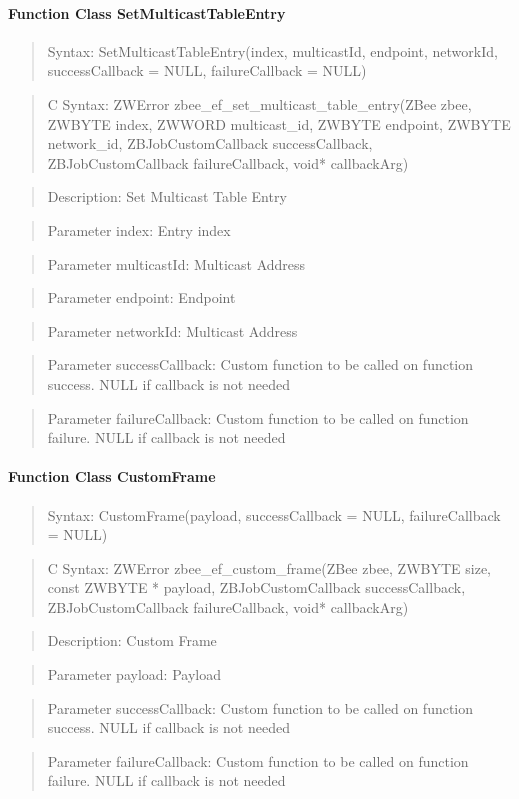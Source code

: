 \paragraph{Function Class SetMulticastTableEntry}
\begin{quote}Syntax: SetMulticastTableEntry(index, multicastId, endpoint, networkId, successCallback = NULL, failureCallback = NULL)\end{quote}
\begin{quote}C Syntax: ZWError zbee\_ef\_set\_multicast\_table\_entry(ZBee zbee, ZWBYTE index, ZWWORD multicast\_id, ZWBYTE endpoint, ZWBYTE network\_id, ZBJobCustomCallback successCallback, ZBJobCustomCallback failureCallback, void* callbackArg)\end{quote}
\begin{quote}Description: Set Multicast Table Entry\end{quote}
\begin{quote}Parameter index: Entry index\end{quote}
\begin{quote}Parameter multicastId: Multicast Address\end{quote}
\begin{quote}Parameter endpoint: Endpoint\end{quote}
\begin{quote}Parameter networkId: Multicast Address\end{quote}
\begin{quote}Parameter successCallback: Custom function to be called on function success. NULL if callback is not needed\end{quote}
\begin{quote}Parameter failureCallback: Custom function to be called on function failure. NULL if callback is not needed\end{quote}


\paragraph{Function Class CustomFrame}
\begin{quote}Syntax: CustomFrame(payload, successCallback = NULL, failureCallback = NULL)\end{quote}
\begin{quote}C Syntax: ZWError zbee\_ef\_custom\_frame(ZBee zbee, ZWBYTE size, const ZWBYTE * payload, ZBJobCustomCallback successCallback, ZBJobCustomCallback failureCallback, void* callbackArg)\end{quote}
\begin{quote}Description: Custom Frame\end{quote}
\begin{quote}Parameter payload: Payload\end{quote}
\begin{quote}Parameter successCallback: Custom function to be called on function success. NULL if callback is not needed\end{quote}
\begin{quote}Parameter failureCallback: Custom function to be called on function failure. NULL if callback is not needed\end{quote}


